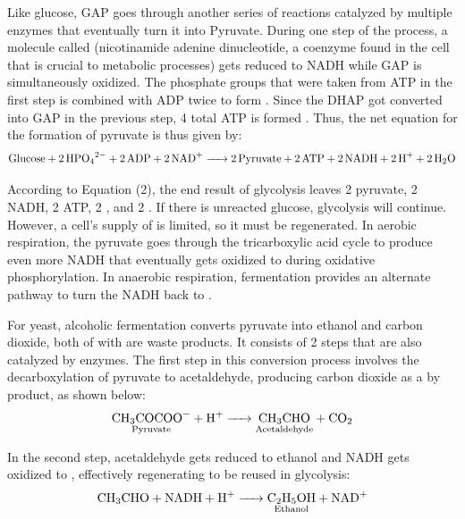 \documentclass{article}
\begin{document}
Like glucose, GAP goes through another series of reactions catalyzed by multiple enzymes that eventually turn it into Pyruvate. During one step of the process, a molecule called  (nicotinamide adenine dinucleotide, a coenzyme found in the cell that is crucial to metabolic processes) \parencite{ref} gets reduced to NADH while GAP is simultaneously oxidized. The phosphate groups that were taken from ATP in the first step is combined with ADP twice to form . Since the DHAP got converted into GAP in the previous step, 4 total ATP is formed \parencite{ref}. Thus, the net equation for the formation of pyruvate is thus given by:
\begin{equation}
    \ce{Glucose + 2HPO_{4}^{2-} + 2ADP + 2NAD+ -> 2Pyruvate + 2ATP + 2 NADH + 2H+ + 2H2O}
\end{equation}

According to Equation (2), the end result of glycolysis leaves 2 pyruvate, 2 NADH, 2 ATP, 2 , and 2 . If there is unreacted glucose, glycolysis will continue. However, a cell's supply of  is limited, so it must be regenerated. In aerobic respiration, the pyruvate goes through the tricarboxylic acid cycle to produce even more NADH that eventually gets oxidized to  during oxidative phosphorylation. In anaerobic respiration, fermentation provides an alternate pathway to turn the NADH back to .

\medskip

For yeast, alcoholic fermentation converts pyruvate into ethanol and carbon dioxide, both of with are waste products. It consists of 2 steps that are also catalyzed by enzymes. The first step in this conversion process involves the decarboxylation of pyruvate to acetaldehyde, producing carbon dioxide as a by product, as shown below:
\begin{equation}
    \ce{\underset{\text{Pyruvate}}{\ce{CH3COCOO-}} + H+ -> \underset{\text{Acetaldehyde}}{\ce{CH3CHO}} + CO2}
\end{equation}

In the second step, acetaldehyde gets reduced to ethanol and NADH gets oxidized to , effectively regenerating  to be reused in glycolysis:
\begin{equation}
    \ce{CH3CHO + NADH + H+ -> \underset{\text{Ethanol}}{\ce{C2H5OH}} + \ce{NAD+}}
\end{equation}
\end{document}
